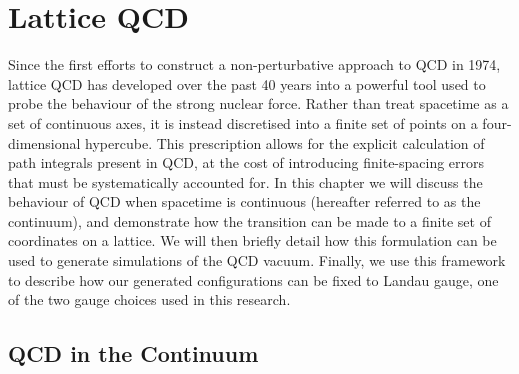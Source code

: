 
\chapter{Lattice QCD}\label{chapter:LatticeQCD}

\ifpdf
    \graphicspath{{Chapter2/Figs/Raster/}{Chapter2/Figs/PDF/}{Chapter2/Figs/}}
\else
    \graphicspath{{Chapter2/Figs/Vector/}{Chapter2/Figs/}}
\fi
Since the first efforts to construct a non-perturbative approach to QCD in 1974\cite{Wilson:1974sk}, lattice QCD has developed over the past 40 years into a powerful tool used to probe the behaviour of the strong nuclear force. Rather than treat spacetime as a set of continuous axes, it is instead discretised into a finite set of points on a four-dimensional hypercube. This prescription allows for the explicit calculation of path integrals present in QCD, at the cost of introducing finite-spacing errors that must be systematically accounted for. In this chapter we will discuss the behaviour of QCD when spacetime is continuous (hereafter referred to as the continuum), and demonstrate how the transition can be made to a finite set of coordinates on a lattice. We will then briefly detail how this formulation can be used to generate simulations of the QCD vacuum. Finally, we use this framework to describe how our generated configurations can be fixed to Landau gauge, one of the two gauge choices used in this research.

\section{QCD in the Continuum}
